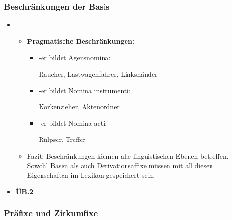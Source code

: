 \begin{frame}
\frametitle{Beschränkungen der Basis}

\begin{itemize}
\item[]

	\begin{itemize}
	
		\item \textbf{Pragmatische Beschränkungen:}
	
		\begin{itemize}
			\item -er bildet Agensnomina: 
		
			\ea Raucher, Lastwagenfahrer, Linkshänder
			\z
			
			\item -er bildet Nomina instrumenti: 
		
			\ea Korkenzieher, Aktenordner
			\z
			
			\item -er bildet Nomina acti: 
		
			\ea Rülpser, Treffer
			\z
			
		\end{itemize}
		
		\item Fazit: Beschränkungen können alle linguistischen Ebenen betreffen. Sowohl Basen als auch Derivationsaffixe müssen mit all diesen Eigenschaften im Lexikon gespeichert sein.
	
	\end{itemize}

\item \textbf{ÜB.2}	
\end{itemize}

\end{frame}



\subsubsection{Präfixe und Zirkumfixe}


